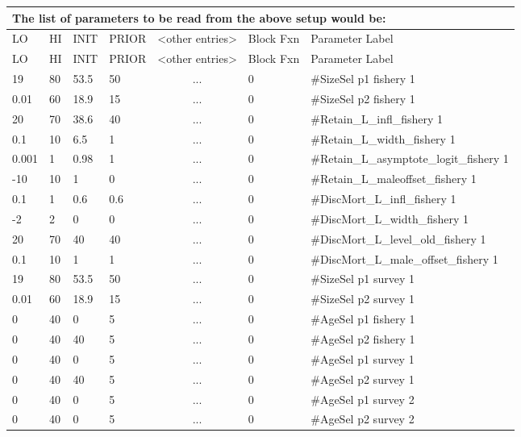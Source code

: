 \begin{longtable}{p{0.75cm} p{0.75cm} p{0.75cm} p{1.25cm} p{2.75cm} p{1.75cm} p{5cm}}
	\multicolumn{7}{l}{The list of parameters to be read from the above setup would be:} \\
	\hline
	LO \Tstrut & HI & INIT & PRIOR & <other entries> & Block Fxn & Parameter Label \Bstrut\\
	\hline
	\endfirsthead

	\hline
	LO \Tstrut & HI & INIT & PRIOR & <other entries> & Block Fxn & Parameter Label \Bstrut\\
	\hline
	\endhead
		
	19    & 80   & 53.5 & 50  & \multicolumn{1}{c}{...}  & 0   & \#SizeSel p1 fishery 1 \Tstrut\\
	0.01  & 60   & 18.9 & 15  & \multicolumn{1}{c}{...}  & 0   & \#SizeSel p2 fishery 1 \\
	20    & 70   & 38.6 & 40  & \multicolumn{1}{c}{...}  & 0   & \#Retain\_L\_infl\_fishery 1 \\
	0.1   & 10   & 6.5  & 1   & \multicolumn{1}{c}{...}  & 0   & \#Retain\_L\_width\_fishery 1 \\
	0.001 & 1    & 0.98 & 1   & \multicolumn{1}{c}{...}  & 0   & \#Retain\_L\_asymptote\_logit\_fishery 1 \\
	-10   & 10   & 1    & 0   & \multicolumn{1}{c}{...}  & 0   & \#Retain\_L\_maleoffset\_fishery 1 \\
	0.1   & 1    & 0.6  & 0.6 & \multicolumn{1}{c}{...}  & 0   & \#DiscMort\_L\_infl\_fishery 1 \\
	-2    & 2    & 0    & 0   & \multicolumn{1}{c}{...}  & 0   & \#DiscMort\_L\_width\_fishery 1 \\
	20    & 70   & 40   & 40  & \multicolumn{1}{c}{...}  & 0   & \#DiscMort\_L\_level\_old\_fishery 1 \\
	0.1   & 10   & 1    & 1   & \multicolumn{1}{c}{...}  & 0   & \#DiscMort\_L\_male\_offset\_fishery 1 \\
	19    & 80   & 53.5 & 50  & \multicolumn{1}{c}{...}  & 0   & \#SizeSel p1 survey 1 \\
	0.01  & 60   & 18.9 & 15  & \multicolumn{1}{c}{...}  & 0   & \#SizeSel p2 survey 1 \\
	0     & 40   & 0    & 5   & \multicolumn{1}{c}{...}  & 0   & \#AgeSel p1 fishery 1 \\
	0     & 40   & 40   & 5   & \multicolumn{1}{c}{...}  & 0   & \#AgeSel p2 fishery 1 \\
	0     & 40   & 0    & 5   & \multicolumn{1}{c}{...}  & 0   & \#AgeSel p1 survey 1 \\
	0     & 40   & 40   & 5   & \multicolumn{1}{c}{...}  & 0   & \#AgeSel p2 survey 1 \\
	0     & 40   & 0    & 5   & \multicolumn{1}{c}{...}  & 0   & \#AgeSel p1 survey 2 \\
	0     & 40   & 0    & 5   & \multicolumn{1}{c}{...}  & 0   & \#AgeSel p2 survey 2 \Bstrut\\
	\hline
\end{longtable}


